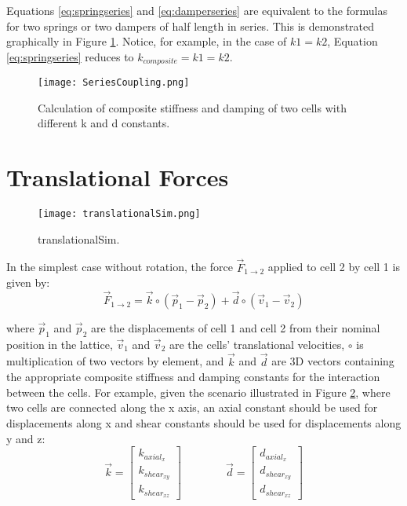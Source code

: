 { Equations \ref{eq:springseries} and \ref{eq:damperseries} are equivalent to the formulas for two springs or two dampers of half length in series.  This is demonstrated graphically in Figure \ref{fig:SeriesCoupling}.  Notice, for example, in the case of $k1=k2$, Equation \ref{eq:springseries} reduces to $ k_{composite} = k1 = k2$.\\
 
 \begin{figure}
  \texttt{[image: SeriesCoupling.png]}
  \caption{Calculation of composite stiffness and damping of two cells with different k and d constants.}
  \label{fig:SeriesCoupling}
\end{figure}


\section{Translational Forces}

\begin{figure}
  \texttt{[image: translationalSim.png]}
  \caption{translationalSim.}
  \label{fig:translationalSim}
\end{figure}

In the simplest case without rotation, the force $\vec{F}_{1 \rightarrow 2}$ applied to cell 2 by cell 1 is given by:
\begin{equation} \label{eq:translationalForce}
\vec{F}_{1\rightarrow2} = \vec{k} \circ (\vec{p}_1 - \vec{p}_2) + \vec{d} \circ (\vec{v}_1 - \vec{v}_2)
\end{equation}

where $\vec{p}_1$ and $\vec{p}_2$ are the displacements of cell 1 and cell 2 from their nominal position in the lattice, $\vec{v}_1$ and $\vec{v}_2$ are the cells' translational velocities, $\circ$ is multiplication of two vectors by element, and $\vec{k}$ and $\vec{d}$ are 3D vectors containing the appropriate composite stiffness and damping constants for the interaction between the cells.  For example, given the scenario illustrated in Figure \ref{fig:translationalSim}, where two cells are connected along the x axis, an axial constant should be used for displacements along x and shear constants should be used for displacements along y and z:
\[ \vec{k} =  \left[ \begin{array}{ccc}
k_{axial_x}\\
k_{shear_{xy}}\\
k_{shear_{xz}}
 \end{array} \right]  
  \qquad\qquad
  \vec{d} =  \left[ \begin{array}{ccc}
d_{axial_x}\\
d_{shear_{xy}}\\
d_{shear_{xz}}
 \end{array} \right] \] 
 
}
